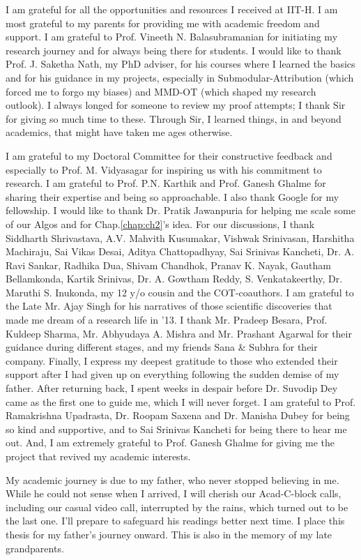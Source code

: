 \acknowledgements
{
I am grateful for all the opportunities and resources I received at IIT-H. I am most grateful to my parents for providing me with academic freedom and support. I am grateful to Prof. Vineeth N. Balasubramanian for initiating my research journey and for always being there for students. I would like to thank Prof. J. Saketha Nath, my PhD adviser, for his courses where I learned the basics and for his guidance in my projects, especially in Submodular-Attribution (which forced me to forgo my biases) and MMD-OT (which shaped my research outlook). I always longed for someone to review my proof attempts; I thank Sir for giving so much time to these. Through Sir, I learned things, in and beyond academics, that might have taken me ages otherwise.

I am grateful to my Doctoral Committee for their constructive feedback and especially to Prof. M. Vidyasagar for inspiring us with his commitment to research. I am grateful to Prof. P.N. Karthik and Prof. Ganesh Ghalme for sharing their expertise and being so approachable. I also thank Google for my fellowship. I would like to thank Dr. Pratik Jawanpuria for helping me scale some of our Algos and for Chap.\ref{chap:ch2}'s idea. 
For our discussions, I thank  Siddharth Shrivastava, A.V. Mahvith Kusumakar, Vishwak Srinivasan, Harshitha Machiraju, Sai Vikas Desai, Aditya Chattopadhyay, Sai Srinivas Kancheti, Dr. A. Ravi Sankar, Radhika Dua, Shivam Chandhok, Pranav K. Nayak, Gautham Bellamkonda, Kartik Srinivas, Dr. A. Gowtham Reddy, S. Venkatakeerthy, Dr. Maruthi S. Inukonda, my 12 y/o cousin and the COT-coauthors.
I am grateful to the Late Mr. Ajay Singh for his narratives of those scientific discoveries that made me dream of a research life in '13. I thank Mr. Pradeep Besara, Prof. Kuldeep Sharma, Mr. Abhyudaya A. Mishra and Mr. Prashant Agarwal for their guidance during different stages, and my friends Sana \& Subhra for their company.
Finally, I express my deepest gratitude to those who extended their support after I had given up on everything following the sudden demise of my father. After returning back, I spent weeks in despair before Dr. Suvodip Dey came as the first one to guide me, which I will never forget. I am grateful to Prof. Ramakrishna Upadrasta, Dr. Roopam Saxena and Dr. Manisha Dubey for being so kind and supportive, and to Sai Srinivas Kancheti for being there to hear me out. 
And, I am extremely grateful to Prof. Ganesh Ghalme for giving me the project that revived my academic interests.

My academic journey is due to my father, who never stopped believing in me. While he could not sense when I arrived, I will cherish our Acad-C-block calls, including our casual video call, interrupted by the rains, which turned out to be the last one.
I'll prepare to safeguard his readings better next time.
I place this thesis for my father's journey onward. This is also in the memory of my late grandparents.
}